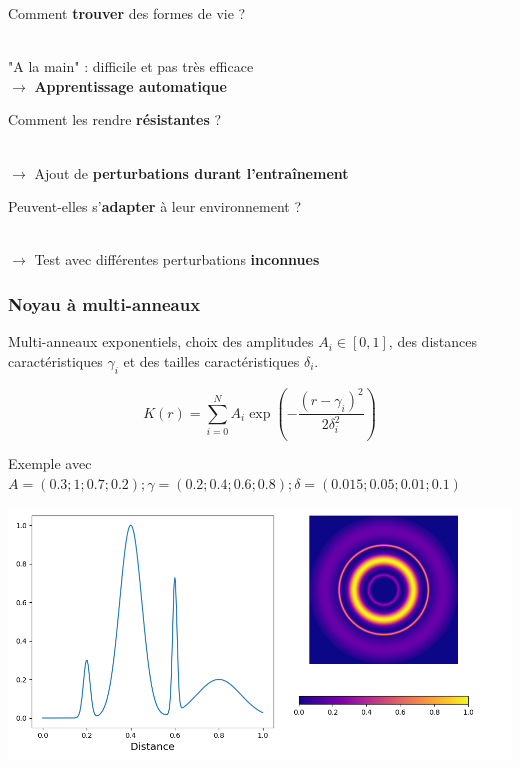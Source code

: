 \documentclass[aspectratio=43]{beamer}
\begin{document}
\begin{frame}[c]

	\centering
	\begin{Large}
		Comment \textbf{trouver} des formes de vie ?
	\end{Large} \\
	"A la main" : difficile et pas tr\`es efficace \\
	$\rightarrow$ \textbf{Apprentissage automatique}

	\vfill

	\begin{Large}
		Comment les rendre \textbf{r\'esistantes} ?
	\end{Large} \\
	$\rightarrow$ Ajout de \textbf{perturbations durant l'entra\^inement}

	\vfill

	\begin{Large}
		 Peuvent-elles s'\textbf{adapter} \`a leur environnement ?
	\end{Large} \\
	$\rightarrow$ Test avec diff\'erentes perturbations \textbf{inconnues}


\end{frame}

\begin{frame}
	\frametitle{Noyau \`a multi-anneaux}
	Multi-anneaux exponentiels, choix des amplitudes $A_i \in [0, 1]$, des distances caract\'eristiques $\gamma_i$
	et des tailles caract\'eristiques $\delta_i$.
	
	$$ K(r) = \sum_{i=0}^{N} A_i \exp\left(-\displaystyle\frac{(r - \gamma_i)^2}{2\delta_i^2}\right)$$
	
	Exemple avec $A = (0.3; 1; 0.7; 0.2); 
	\gamma = (0.2; 0.4; 0.6; 0.8);
	\delta = (0.015; 0.05; 0.01; 0.1)$

	\vspace*{5pt}

	\centering\includegraphics[width=.6\textwidth]{plot_multi_ring_kernel.png}
	
\end{frame}
\end{document}

